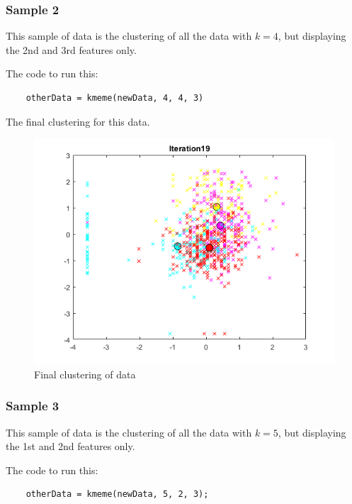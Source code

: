 \documentclass[12pt]{article}
\begin{document}
\newpage

\subsubsection{Sample 2}
This sample of data is the clustering of all the data with $k=4$, but displaying the 2nd and 3rd features only.

\noindent
The code to run this:

\begin{verbatim}
    otherData = kmeme(newData, 4, 4, 3)
\end{verbatim}

The final clustering for this data.
\begin{figure}[h!]
    \begin{center}
        \includegraphics[scale=1.2]{TQ3_2.png}
        \caption{Final clustering of data}
    \end{center}    
\end{figure}

\newpage

\subsubsection{Sample 3}
This sample of data is the clustering of all the data with $k=5$, but displaying the 1st and 2nd features only.

\noindent
The code to run this:

\begin{verbatim}
    otherData = kmeme(newData, 5, 2, 3);
\end{verbatim}
\end{document}
